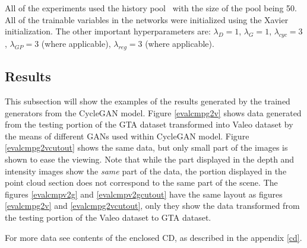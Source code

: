 All of the experiments used the history pool~\cite{historypool} with the size of the pool being 50. All of the trainable variables in the networks were initialized using the Xavier~\cite{xavier} initialization. The other important hyperparameters are: $\lambda_D = 1$, $\lambda_G = 1$, $\lambda_{cyc} = 3$, $\lambda_{GP} = 3$ (where applicable), $\lambda_{reg} = 3$ (where applicable).

\subsection{Results}

This subsection will show the examples of the results generated by the trained generators from the CycleGAN model. Figure \ref{evalcmpg2v} shows data generated from the testing portion of the GTA dataset transformed into Valeo dataset by the means of different GANs used within CycleGAN model. Figure \ref{evalcmpg2vcutout} shows the same data, but only small part of the images is shown to ease the viewing. Note that while the part displayed in the depth and intensity images show the {\em same} part of the data, the portion displayed in the point cloud section does not correspond to the same part of the scene. The figures \ref{evalcmpv2g} and \ref{evalcmpv2gcutout} have the same layout as figures \ref{evalcmpg2v} and \ref{evalcmpg2vcutout}, only they show the data transformed from the testing portion of the Valeo dataset to GTA dataset.

For more data see contents of the enclosed CD, as described in the appendix \ref{cd}.

